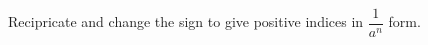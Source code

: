 \documentclass[12pt, a4paper, addpoints]{exam}
\newcommand{\ts}{\vspace{16mm}}
\begin{document}
\begin{questions}
\begin{multicols}{6}
\end{multicols}


\ts







\question  Recipricate  and change the sign to give positive indices in $\dfrac{1}{a^n}$  form.
\setlength{\columnsep}{20pt}
\begin{multicols}{6}
\end{multicols}
\end{questions}
\end{document}
